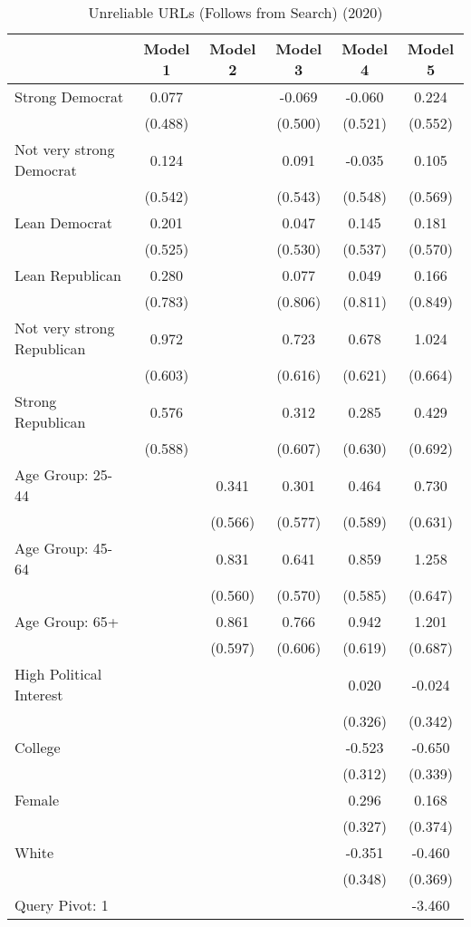 \begin{table}

\caption{Unreliable URLs (Follows from Search) (2020)}
\centering
\begin{tabular}[t]{lccccc}
\toprule
  & Model 1 & Model 2 & Model 3 & Model 4 & Model 5\\
\midrule
Strong Democrat & 0.077 &  & -0.069 & -0.060 & 0.224\\
 & (0.488) &  & (0.500) & (0.521) & (0.552)\\
Not very strong Democrat & 0.124 &  & 0.091 & -0.035 & 0.105\\
 & (0.542) &  & (0.543) & (0.548) & (0.569)\\
Lean Democrat & 0.201 &  & 0.047 & 0.145 & 0.181\\
 & (0.525) &  & (0.530) & (0.537) & (0.570)\\
Lean Republican & 0.280 &  & 0.077 & 0.049 & 0.166\\
 & (0.783) &  & (0.806) & (0.811) & (0.849)\\
Not very strong Republican & 0.972 &  & 0.723 & 0.678 & 1.024\\
 & (0.603) &  & (0.616) & (0.621) & (0.664)\\
Strong Republican & 0.576 &  & 0.312 & 0.285 & 0.429\\
 & (0.588) &  & (0.607) & (0.630) & (0.692)\\
Age Group: 25-44 &  & 0.341 & 0.301 & 0.464 & 0.730\\
 &  & (0.566) & (0.577) & (0.589) & (0.631)\\
Age Group: 45-64 &  & 0.831 & 0.641 & 0.859 & 1.258\\
 &  & (0.560) & (0.570) & (0.585) & (0.647)\\
Age Group: 65+ &  & 0.861 & 0.766 & 0.942 & 1.201\\
 &  & (0.597) & (0.606) & (0.619) & (0.687)\\
High Political Interest &  &  &  & 0.020 & -0.024\\
 &  &  &  & (0.326) & (0.342)\\
College &  &  &  & -0.523 & -0.650\\
 &  &  &  & (0.312) & (0.339)\\
Female &  &  &  & 0.296 & 0.168\\
 &  &  &  & (0.327) & (0.374)\\
White &  &  &  & -0.351 & -0.460\\
 &  &  &  & (0.348) & (0.369)\\
Query Pivot: 1 &  &  &  &  & -3.460\\

\end{tabular}
\end{table}
